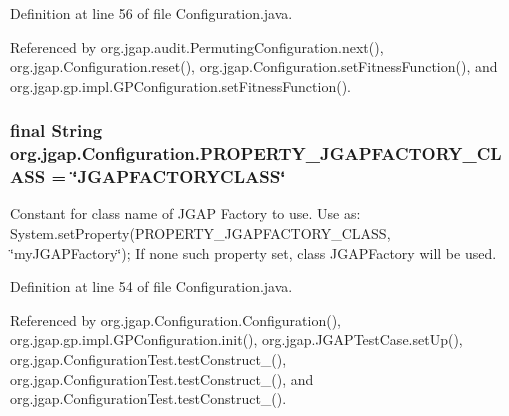 Definition at line 56 of file Configuration.\-java.



Referenced by org.\-jgap.\-audit.\-Permuting\-Configuration.\-next(), org.\-jgap.\-Configuration.\-reset(), org.\-jgap.\-Configuration.\-set\-Fitness\-Function(), and org.\-jgap.\-gp.\-impl.\-G\-P\-Configuration.\-set\-Fitness\-Function().

\hypertarget{classorg_1_1jgap_1_1_configuration_a7b5b91f069a6043a14d5ccde9fd480d7}{
\subsubsection[{P\-R\-O\-P\-E\-R\-T\-Y\-\_\-\-J\-G\-A\-P\-F\-A\-C\-T\-O\-R\-Y\-\_\-\-C\-L\-A\-S\-S}]{\setlength{\rightskip}{0pt plus 5cm}final String org.\-jgap.\-Configuration.\-P\-R\-O\-P\-E\-R\-T\-Y\-\_\-\-J\-G\-A\-P\-F\-A\-C\-T\-O\-R\-Y\-\_\-\-C\-L\-A\-S\-S = \char`\"{}J\-G\-A\-P\-F\-A\-C\-T\-O\-R\-Y\-C\-L\-A\-S\-S\char`\"{}\hspace{0.3cm}{\ttfamily [static]}}}\label{classorg_1_1jgap_1_1_configuration_a7b5b91f069a6043a14d5ccde9fd480d7}
Constant for class name of J\-G\-A\-P Factory to use. Use as\-: System.\-set\-Property(P\-R\-O\-P\-E\-R\-T\-Y\-\_\-\-J\-G\-A\-P\-F\-A\-C\-T\-O\-R\-Y\-\_\-\-C\-L\-A\-S\-S, \char`\"{}my\-J\-G\-A\-P\-Factory\char`\"{}); If none such property set, class J\-G\-A\-P\-Factory will be used. 

Definition at line 54 of file Configuration.\-java.



Referenced by org.\-jgap.\-Configuration.\-Configuration(), org.\-jgap.\-gp.\-impl.\-G\-P\-Configuration.\-init(), org.\-jgap.\-J\-G\-A\-P\-Test\-Case.\-set\-Up(), org.\-jgap.\-Configuration\-Test.\-test\-Construct\-\_(), org.\-jgap.\-Configuration\-Test.\-test\-Construct\-\_(), and org.\-jgap.\-Configuration\-Test.\-test\-Construct\-\_().

